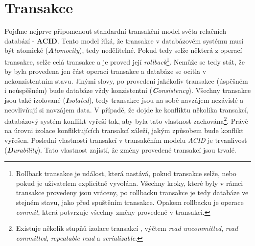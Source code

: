\section{Transakce}
Pojďme nejprve připomenout standardní transakční model světa relačních databází - \textbf{ACID}. Tento model říká, že transakce v databázovém systému musí být atomické (\textit{\textbf{A}tomocity}), tedy nedělitelné. Pokud tedy selže některá z operací transakce, selže celá transakce a je proved její \textit{rollback}\footnote{Rollback transakce je událost, která nastává, pokud transakce selže, nebo pokud je uživatelem explicitně vyvolána. Všechny kroky, které byly v rámci transakce provedeny jsou vráceny, po rollbacku transakce je tedy databáze ve stejném stavu, jako před spuštěním transakce. Opakem rollbacku je operace \textit{commit}, která potvrzuje všechny změny provedené v transakci.}. Nemůže se tedy stát, že by byla provedena jen část operací transakce a databáze se ocitla v nekonzistentním stavu. Jinými slovy, po provedení jakékoliv transakce (úspěšném i neúspěšném) bude databáze vždy konzistentní (\textit{\textbf{C}onsistency}). Všechny transakce jsou také izolované (\textit{\textbf{I}solated}), tedy transakce jsou na sobě navzájem nezávislé a neovlivňují si navzájem data. V případě, že dojde ke konfliktu několika transakcí, databázový systém konflikt vyřeší tak, aby byla tato vlastnost zachována\footnote{Existuje několik stupňů izolace transakcí , výčtem \textit{read uncommitted}, \textit{read committed}, \textit{repeatable read} a \textit{serializable}.}.
Právě na úrovni izolace konfliktujících transakcí záleží, jakým způsobem bude konflikt vyřešen. Poslední vlastností transakcí v transakčním modelu \textit{ACID} je trvanlivost (\textit{\textbf{D}urability}). Tato vlastnost zajistí, že změny provedené transakcí jsou trvalé.


